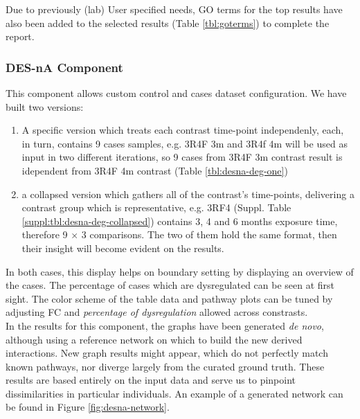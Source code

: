 Due to previously (lab) User specified needs, GO terms for the top results have also been added to the selected results (Table \ref{tbl:goterms}) to complete the report.

\subsubsection{DES-nA Component}
This component allows custom control and cases dataset configuration. We have built two versions: 

\begin{enumerate}
    \item A specific version which treats each contrast time-point independenly, each, in turn, contains 9 cases samples, e.g. 3R4F 3m and 3R4f 4m will be used as input in two different iterations, so 9 cases from 3R4F 3m contrast result is idependent from 3R4F 4m contrast (Table \ref{tbl:desna-deg-one})
    \item a collapsed version which gathers all of the contrast's time-points, delivering a contrast group which is representative, e.g. 3RF4 (Suppl. Table \ref{suppl:tbl:desna-deg-collapsed}) contains 3, 4 and 6 months exposure time, therefore 9 $\times$ 3 comparisons. The two of them hold the same format, then their insight will become evident on the results.
\end{enumerate}



In both cases, this display helps on boundary setting by displaying an overview of the cases. The percentage of cases which are dysregulated can be seen at first sight. The color scheme of the table data and pathway plots can be tuned by adjusting FC and \textit{percentage of dysregulation} allowed across constrasts.
\\

In the results for this component, the graphs have been generated \textit{de novo}, although using a reference network on which to build the new derived interactions. New graph results might appear, which do not perfectly match known pathways, nor diverge largely from the curated ground truth. These results are based entirely on the input data and serve us to pinpoint dissimilarities in particular individuals. An example of a generated network can be found in Figure \ref{fig:desna-network}.
\\


